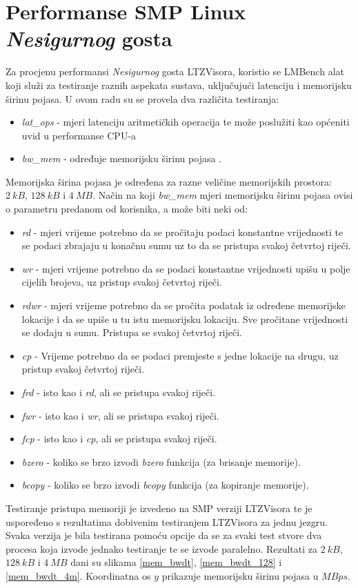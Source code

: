 \documentclass[times, utf8, diplomski, numeric]{fer}
\begin{document}
\section{Performanse SMP Linux \textit{Nesigurnog} gosta}
Za procjenu performansi \textit{Nesigurnog} gosta LTZVisora, koristio se LMBench alat koji služi za testiranje raznih
aspekata sustava, uključujući latenciju i memorijsku širinu pojasa. U ovom radu su se provela dva različita testiranja:
\begin{itemize}
  \item {\textit{lat\_ops} - mjeri latenciju aritmetičkih operacija te može poslužiti kao općeniti uvid u
  performanse CPU-a}
  \item{\textit{bw\_mem} - određuje memorijsku širinu pojasa .}
\end{itemize}
Memorijska širina pojasa je određena za razne veličine memorijskih prostora: $2~kB$, $128~kB$ i $4~MB$.
Način na koji \textit{bw\_mem} mjeri memorijsku širinu pojasa ovisi o parametru predanom od korisnika, a može biti
neki od:
\begin{itemize}
  \item{\textit{rd} - mjeri vrijeme potrebno da se pročitaju podaci konstantne vrijednosti te se podaci zbrajaju u
  konačnu sumu uz to da se pristupa svakoj četvrtoj riječi.}
  \item{\textit{wr} - mjeri vrijeme potrebno da se podaci konstantne vrijednosti upišu u polje cijelih brojeva,
  uz pristup svakoj četvrtoj riječi.}
  \item{\textit{rdwr} - mjeri vrijeme potrebno da se pročita podatak iz određene memorijske lokacije i da se upiše
  u tu istu memorijsku lokaciju. Sve pročitane vrijednosti se dodaju u sumu. Pristupa se svakoj četvrtoj riječi.}
  \item{\textit{cp} - Vrijeme potrebno da se podaci premjeste s jedne lokacije na drugu, uz pristup svakoj četvrtoj riječi.}
  \item{\textit{frd} - isto kao i \textit{rd}, ali se pristupa svakoj riječi.}
  \item{\textit{fwr} - isto kao i \textit{wr}, ali se pristupa svakoj riječi.}
  \item{\textit{fcp} - isto kao i \textit{cp}, ali se pristupa svakoj riječi.}
  \item{\textit{bzero} - koliko se brzo izvodi \textit{bzero} funkcija (za brisanje memorije).}
  \item{\textit{bcopy} - koliko se brzo izvodi \textit{bcopy} funkcija (za kopiranje memorije).}
\end{itemize}
Testiranje pristupa memoriji je izvedeno na SMP verziji LTZVisora te je uspoređeno s rezultatima dobivenim testiranjem
LTZVisora za jednu jezgru. Svaka verzija je bila testirana pomoću opcije da se za svaki test stvore dva procesa koja
izvode jednako testiranje te se izvode paralelno. Rezultati za $2~kB$, $128~kB$ i $4~MB$ dani su slikama \ref{mem_bwdt},
\ref{mem_bwdt_128} i \ref{mem_bwdt_4m}. Koordinatna os $y$ prikazuje memorijsku širinu pojasa u $MBps$.
\end{document}
